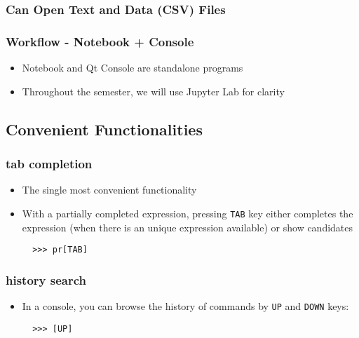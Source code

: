 \documentclass[10pt,article]{article}
\begin{document}
\subsubsection{Can Open Text and Data (CSV) Files}
\label{sec:orgfb644c8}
\subsubsection{Workflow - Notebook + Console}
\label{sec:orgf04dc7e}
\begin{itemize}
\item Notebook and Qt Console are standalone programs
\item Throughout the semester, we will use Jupyter Lab for clarity
\end{itemize}
\subsection{Convenient Functionalities}
\label{sec:org7ca76d7}
\subsubsection{tab completion}
\label{sec:org94945ea}

\iffalse
\url{https://foxdeploy.files.wordpress.com/2017/01/upgrade-your-code1.png}
\fi

\begin{itemize}
\item The single most convenient functionality
\item With a partially completed expression, pressing \texttt{TAB} key either completes
the expression (when there is an unique expression available) or show candidates

\begin{verbatim}
  >>> pr[TAB]

\end{verbatim}
\end{itemize}

\subsubsection{history search}
\label{sec:org6afcb82}
\begin{itemize}
\item In a console, you can browse the history of commands by \texttt{UP} and \texttt{DOWN} keys:

\begin{verbatim}
  >>> [UP]
\end{verbatim}
\end{itemize}
\end{document}
